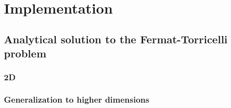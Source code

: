  {
\abnormalparskip{0pt}
\chapter{Implementation}
\label{cha:implementation}
}

\section{Analytical solution to the Fermat-Torricelli problem}
\label{sec:analyt-solut-ferm}

\subsection{2D}
\label{sec:2d}

\subsection{Generalization to higher dimensions}
\label{sec:gener-high-dimens}


\chapterbreak{}

